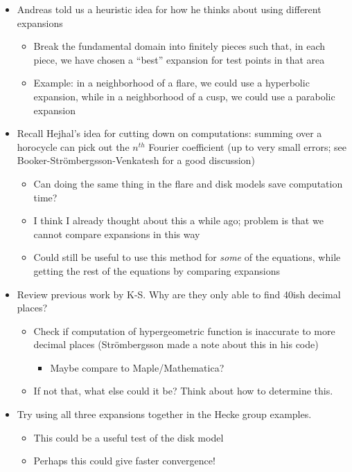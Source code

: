 \documentclass[]{article}
\begin{document}
\begin{itemize}
	\item Andreas told us a heuristic idea for how he thinks about using different expansions
	\begin{itemize}
		\item Break the fundamental domain into finitely pieces such that, in each piece, we have chosen a ``best'' expansion for test points in that area
		\item Example: in a neighborhood of a flare, we could use a hyperbolic expansion, while in a neighborhood of a cusp, we could use a parabolic expansion
	\end{itemize}
	\item Recall Hejhal's idea for cutting down on computations: summing over a horocycle can pick out the $n^{th}$ Fourier coefficient (up to very small errors; see Booker-Str\"ombergsson-Venkatesh for a good discussion)
	\begin{itemize}
		\item Can doing the same thing in the flare and disk models save computation time?
		\item I think I already thought about this a while ago; problem is that we cannot compare expansions in this way
		\item Could still be useful to use this method for \textit{some} of the equations, while getting the rest of the equations by comparing expansions
	\end{itemize}
	\item Review previous work by K-S. Why are they only able to find 40ish decimal places?
	\begin{itemize}
		\item Check if computation of hypergeometric function is inaccurate to more decimal places (Str\"ombergsson made a note about this in his code)
		\begin{itemize}
			\item Maybe compare to Maple/Mathematica?
		\end{itemize}
		\item If not that, what else could it be? Think about how to determine this.
	\end{itemize}
	\item Try using all three expansions together in the Hecke group examples.
	\begin{itemize}
		\item This could be a useful test of the disk model
		\item Perhaps this could give faster convergence!

\end{itemize}
\end{itemize}
\end{document}
